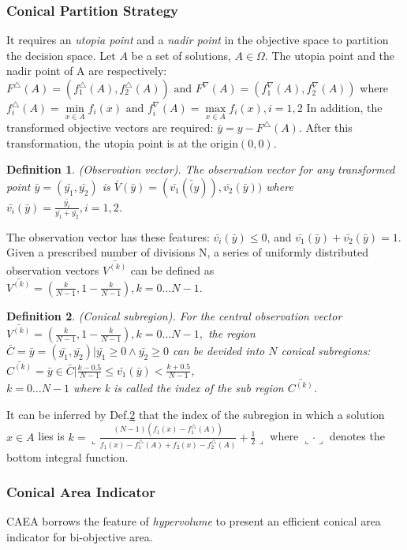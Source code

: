 \documentclass[a4paper, 11pt]{article}
\newtheorem{mydef}{Definition}
\begin{document}
\subsubsection{Conical Partition Strategy}
It requires an \emph{utopia point} and a \emph{nadir point} in the objective space to partition the decision space.
Let $A$ be a set of solutions, $A\in\Omega$. The utopia point and the nadir point of A are respectively:
$F^\triangle(A)=(f^\triangle_1(A),f^\triangle_2(A))\textrm{ and } F^\nabla(A)=(f^\nabla_1(A),f^\nabla_2(A))$
where $f^\triangle_i(A)=\min\limits_{x\in A} f_i(x)\textrm{ and } f^\nabla_i(A)=\max\limits_{x\in A}f_i(x),i=1,2$
In addition, the transformed objective vectors are required: $\bar{y}=y-F^\triangle(A)$. After this transformation, the utopia point is at the origin$(0,0)$.

\begin{mydef}\emph{(Observation vector).}
The observation vector for any transformed point $\bar{y}=(\bar{y_1},\bar{y_2})$ is $\bar{V}(\bar{y})=(\bar{v_1}(\bar(y)),\bar{v_2}(\bar{y}))$ where $\bar{v_i}(\bar{y})=\frac{\bar{y_i}}{\bar{y_1}+\bar{y_2}},i=1,2$.
\end{mydef}
The observation vector has these features: $\bar{v_i}(\bar{y})\leq0$, and $\bar{v_1}(\bar{y})+\bar{v_2}(\bar{y})=1$. Given a prescribed number of divisions N, a series of uniformly distributed observation vectors $\bar{V^{(k)}}$ can be defined as $\bar{V^{(k)}}=(\frac{k}{N-1}, 1-\frac{k}{N-1}),k=0\ldots N-1$.

\begin{mydef}\label{def:conisub}\emph{(Conical subregion).}
For the central observation vector $\bar{V^{(k)}}=(\frac{k}{N-1},1-\frac{k}{N-1}),k=0\ldots N-1,$ the region $\bar{C}={\bar{y}=(\bar{y_1},\bar{y_2})|\bar{y_1}\geq0\wedge\bar{y_2}\geq0}$
can be devided into $N$ conical subregions: $\bar{C^{(k)}}={\bar{y}\in \bar{C}|\frac{k-0.5}{N-1}\le\bar{v_1}(\bar{y})<\frac{k+0.5}{N-1}}$,\\$k=0\ldots N-1$ where k is called the index of the sub region $\bar{C^{(k)}}$.
\end{mydef}
It can be inferred by Def.\ref{def:conisub} that the index of the subregion in which a solution $x\in A$ lies is $k= \llcorner\frac{(N-1)(f_1(x)-f^\triangle_1(A))}{f_1(x)-f^\triangle_1(A)+f_2(x)-f^\triangle_2(A)}+\frac{1}{2}\lrcorner$
where $\llcorner \cdot \lrcorner$ denotes the bottom integral function.

\subsubsection{Conical Area Indicator}
CAEA borrows the feature of \emph{hypervolume} to present an efficient conical area indicator for bi-objective area.
\end{document}
